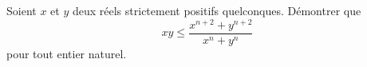 \documentclass[varwidth]{standalone}
\begin{document}
    Soient $x$ et $y$ deux r\'eels strictement positifs quelconques. D\'emontrer que
    \[
        xy \leq \frac{x^{n + 2} + y^{n + 2}}{x^n + y^n}   
    \]
    pour tout entier naturel.
\end{document}

